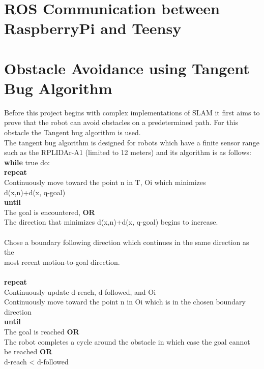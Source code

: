 \section{ROS Communication between RaspberryPi and Teensy }
\section{Obstacle Avoidance using Tangent Bug Algorithm}
Before this project begins with complex implementations of SLAM it first aims to prove that the robot can avoid obstacles on a predetermined path. For this obstacle the Tangent bug algorithm is used.\\

The tangent bug algorithm is designed for robots which have a finite sensor range such as the RPLIDAr-A1 (limited to 12 meters) and its algorithm is as follows:\\

\noindent \textbf{while} true do:\\
\tab \textbf{repeat}\\
\tab \tab Continuously move toward the point n in {T, Oi} which minimizes \\
\tab \tab d(x,n)+d(x, q-goal)\\
\tab \textbf{until}\\
\tab \tab The goal is encountered, \textbf{OR}\\
\tab \tab The direction that minimizes  d(x,n)+d(x, q-goal) begins to increase.\\
\\
\tab Chose a boundary following direction which continues in the same direction as the\\ 
\tab most recent motion-to-goal direction.\\
\\
\tab \textbf{repeat}\\
\tab \tab Continuously update d-reach, d-followed, and {Oi}\\
\tab \tab Continuously move toward the point n in {Oi} which is in the chosen boundary\\
\tab \tab direction\\
\tab \textbf{until}\\
\tab \tab The goal is reached \textbf{OR}\\
\tab \tab The robot completes a cycle around the obstacle in which case the goal cannot\\
\tab \tab be reached \textbf{OR}\\
\tab \tab d-reach < d-followed\\



